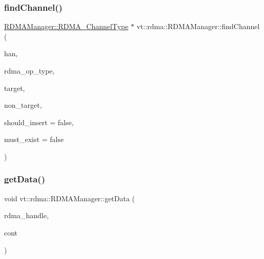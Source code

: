 \subsubsection{\texorpdfstring{find\+Channel()}{findChannel()}}
{\footnotesize\ttfamily \hyperlink{structvt_1_1rdma_1_1_r_d_m_a_manager_ad6a7e417dca07fe5743318e1153677a8}{R\+D\+M\+A\+Manager\+::\+R\+D\+M\+A\+\_\+\+Channel\+Type} $\ast$ vt\+::rdma\+::\+R\+D\+M\+A\+Manager\+::find\+Channel (\begin{DoxyParamCaption}\item[{\hyperlink{namespacevt_a10442579ec4e7ebef223818e64bcf908}{R\+D\+M\+A\+\_\+\+Handle\+Type} const \&}]{han,  }\item[{\hyperlink{namespacevt_1_1rdma_ac848e1d9da43db6294bd06f83e5d3946}{R\+D\+M\+A\+\_\+\+Type\+Type} const \&}]{rdma\+\_\+op\+\_\+type,  }\item[{\hyperlink{namespacevt_a866da9d0efc19c0a1ce79e9e492f47e2}{Node\+Type} const \&}]{target,  }\item[{\hyperlink{namespacevt_a866da9d0efc19c0a1ce79e9e492f47e2}{Node\+Type} const \&}]{non\+\_\+target,  }\item[{bool const \&}]{should\+\_\+insert = {\ttfamily false},  }\item[{bool const \&}]{must\+\_\+exist = {\ttfamily false} }\end{DoxyParamCaption})\hspace{0.3cm}{\ttfamily [private]}}

\mbox{\label{structvt_1_1rdma_1_1_r_d_m_a_manager_aebefa1395f990efb66284adc1495f6d4}} 
\subsubsection{\texorpdfstring{get\+Data()}{getData()}\hspace{0.1cm}{\footnotesize\ttfamily [1/2]}}
{\footnotesize\ttfamily void vt\+::rdma\+::\+R\+D\+M\+A\+Manager\+::get\+Data (\begin{DoxyParamCaption}\item[{\hyperlink{namespacevt_a10442579ec4e7ebef223818e64bcf908}{R\+D\+M\+A\+\_\+\+Handle\+Type} const \&}]{rdma\+\_\+handle,  }\item[{\hyperlink{namespacevt_1_1rdma_aa07fa86d8eca8853254b40fc0e565726}{R\+D\+M\+A\+\_\+\+Recv\+Type}}]{cont }\end{DoxyParamCaption})\hspace{0.3cm}{\ttfamily [inline]}}



